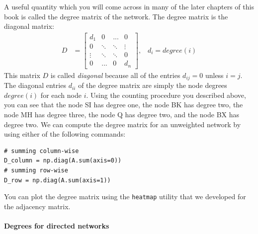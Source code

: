 A useful quantity which you will come across in many of the later chapters of this book is called the {degree matrix} of the network. The degree matrix is the {diagonal} matrix:
\begin{align*}
    D &= \begin{bmatrix}
        d_1 & 0 & ... & 0 \\
        0 & \ddots & \ddots& \vdots \\
        \vdots & \ddots & \ddots & 0 \\
        0 & ... & 0 & d_n
    \end{bmatrix}, \;\;\; d_i = degree(i)
\end{align*}
This matrix $D$ is called \textit{diagonal} because all of the entries $d_{ij} = 0$ unless $i = j$. The diagonal entries $d_{ii}$ of the degree matrix are simply the node degrees $degree(i)$ for each node $i$. Using the counting procedure you described above, you can see that the node SI has degree one, the node BK has degree two, the node MH has degree three, the node Q has degree two, and the node BX has degree two. We can compute the degree matrix for an unweighted network by using either of the following commands:

\begin{lstlisting}[style=python]
# summing column-wise
D_column = np.diag(A.sum(axis=0))
# summing row-wise
D_row = np.diag(A.sum(axis=1))
\end{lstlisting}

You can plot the degree matrix using the \texttt{heatmap} utility that we developed for the adjacency matrix.

\paragraph{Degrees for directed networks}

